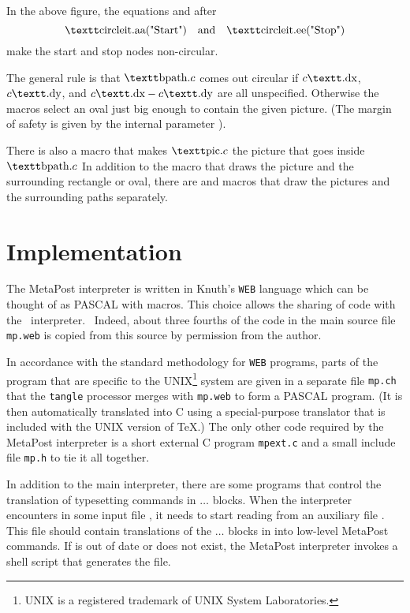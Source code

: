In the above figure, the equations  and  after
$$ \lit{circleit.aa("Start")}
    \quad{\rm and}\quad \lit{circleit.ee("Stop")}
$$
make the start and stop nodes non-circular.

The general rule is that $\lit{bpath.}c$ comes out circular if
$c\lit{.dx}$, $c\lit{.dy}$, and $c\lit{.dx}-c\lit{.dy}$ are all unspecified.
Otherwise the macros select an oval just big enough to contain the given
picture.  (The margin of safety is given by the internal parameter
).

There is also a  macro that makes $\lit{pic.}c$ the picture that
goes inside $\lit{bpath.}c$  In addition to the  macro
that draws the picture and the surrounding rectangle or oval, there are
 and  macros that draw the pictures and
the surrounding paths separately.

\section{Implementation}
\label{impsec}

The MetaPost interpreter is written in Knuth's {\tt WEB} language which
can be thought of as PASCAL with macros.  This choice allows the
sharing of code with the \MF\ interpreter.~\cite{kn:d}  Indeed, about
three fourths of the code in the main source file {\tt mp.web} is copied
from this source by permission from the author.

In accordance with the standard methodology for {\tt WEB} programs,
parts of the program that are specific to the UNIX\footnote{UNIX is a
registered trademark of UNIX System Laboratories.} system are given in a
separate file {\tt mp.ch} that
the {\tt tangle} processor merges with {\tt mp.web} to form a PASCAL
program.  (It is then automatically translated into C using a
special-purpose translator that is included with the UNIX version
of \TeX.)  The only other code required by the MetaPost interpreter
is a short external C program {\tt mpext.c} and a small include file
{\tt mp.h} to tie it all together.

In addition to the main interpreter, there are some programs that control
the translation of typesetting commands in  $\ldots$ 
blocks.  When the interpreter encounters  in some input file
, it needs to start reading from an auxiliary file .
This file should contain translations of the   $\ldots$ 
blocks in  into low-level MetaPost commands.  If  is
out of date or does not exist, the MetaPost interpreter invokes a shell script
that generates the file.

